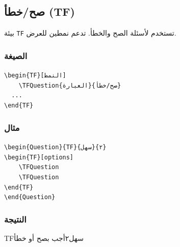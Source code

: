 \documentclass[a4paper]{article}
\newcommand{\engtt}[1]{\textenglish{\texttt{#1}}}
\begin{document}
\subsection{صح/خطأ (TF)}

بيئة \engtt{TF} تستخدم لأسئلة الصح والخطأ. تدعم نمطين للعرض.

\subsubsection*{الصيغة}

\begin{LTR}\ttfamily
\verb|\begin{TF}[النمط]|\\
\verb|    \TFQuestion{العبارة}{صح/خطأ}|\\
\verb|  ...|\\
\verb|\end{TF}|
\end{LTR}

\subsubsection*{مثال}

\begin{LTR}\ttfamily
\verb|\begin{Question}{TF}{سهل}{٢}|\\
\verb|\begin{TF}[options]|\\
\verb|    \TFQuestion|\\
\verb|    \TFQuestion|\\
\verb|\end{TF}|\\
\verb|\end{Question}|
\end{LTR}

\subsubsection*{النتيجة}

\begin{Question}{TF}{سهل}{٢}{أجب بصح أو خطأ}
\begin{TF}[options]
\end{TF}
\end{Question}
\end{document}
